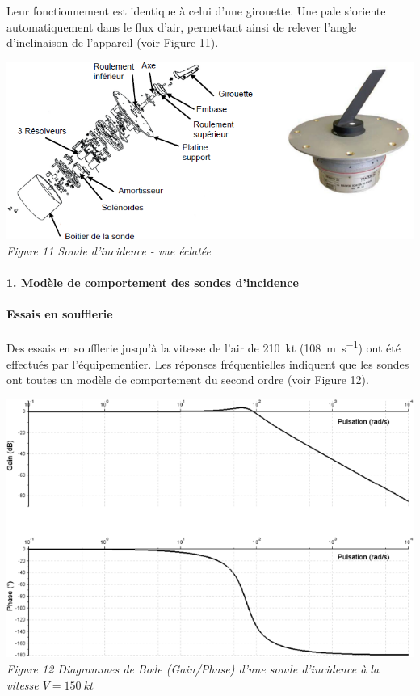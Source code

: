 \begin{multicols}{2}
Leur fonctionnement est identique à celui d’une girouette. Une pale s’oriente automatiquement dans le flux
d’air, permettant ainsi de relever l’angle d’inclinaison de l’appareil (voir Figure 11).

\begin{center}
\includegraphics[width=\linewidth]{images/fig_14}
\textit{Figure 11 Sonde d'incidence - vue éclatée}
\end{center}

\paragraph*{1. Modèle de comportement des sondes d’incidence}
\paragraph*{Essais en soufflerie}

Des essais en soufflerie jusqu’à la vitesse de l’air de \SI{210}{kt} (\SI{108}{m.s^{-1}}) ont été effectués par l’équipementier.
Les réponses fréquentielles indiquent que les sondes ont toutes un modèle de comportement du second
ordre (voir Figure 12).


\begin{center}
\includegraphics[width=\linewidth]{images/fig_15}
\textit{Figure 12 Diagrammes de Bode (Gain/Phase) d'une sonde d'incidence à la vitesse $V=\SI{150}{kt}$}
\end{center}



\end{multicols}
